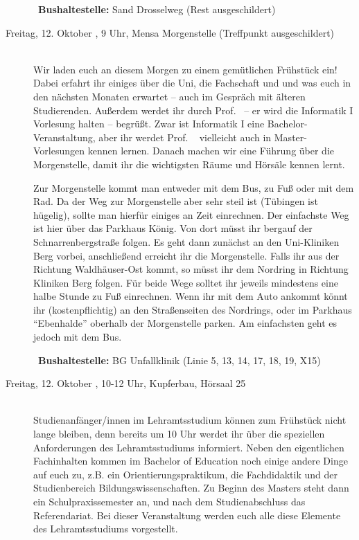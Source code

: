 \begin{description}
~\textbf{Bushaltestelle:} Sand Drosselweg (Rest ausgeschildert)


\item[Freitag, 12. Oktober \Jahr, 9 Uhr, Mensa Morgenstelle (Treffpunkt ausgeschildert)]\ \\
Wir laden euch an diesem Morgen zu einem gemütlichen Frühstück ein! Dabei erfahrt ihr einiges über die Uni, die Fachschaft und und was euch in den nächsten Monaten erwartet -- auch im Gespräch mit älteren
Studierenden. Außerdem werdet ihr durch Prof. \Infoprof~-- er wird die Informatik I Vorlesung halten -- begrüßt.
\ifmaster Zwar ist Informatik I eine Bachelor-Veranstaltung, aber ihr werdet Prof. \Infoprof~ vielleicht auch in Master-Vorlesungen kennen lernen. \fi
Danach machen wir eine Führung über die Morgenstelle, damit ihr die wichtigsten Räume und Hörsäle kennen lernt.

Zur Morgenstelle kommt man entweder mit dem Bus, zu Fuß oder mit dem Rad. Da der Weg zur Morgenstelle aber sehr steil ist (Tübingen ist hügelig), sollte man hierfür einiges an Zeit einrechnen.
Der einfachste Weg ist hier über das Parkhaus König. Von dort müsst ihr bergauf der Schnarrenbergstraße folgen. Es geht dann zunächst an den Uni-Kliniken Berg vorbei, anschließend erreicht ihr die Morgenstelle. Falls ihr aus der Richtung Waldh\"auser-Ost kommt, so m\"usst ihr dem Nordring in Richtung Kliniken Berg folgen. Für beide Wege solltet ihr jeweils mindestens eine halbe Stunde zu Fuß einrechnen.
Wenn ihr mit dem Auto ankommt k\"onnt ihr (kostenpflichtig) an den Straßenseiten des Nordrings, oder im Parkhaus "`Ebenhalde"' oberhalb der Morgenstelle parken. Am einfachsten geht es jedoch mit dem Bus.

~\textbf{Bushaltestelle:} BG Unfallklinik (Linie 5, 13, 14, 17, 18, 19, X15)

\iflehramt
\item[Freitag, 12. Oktober \Jahr, 10-12 Uhr, Kupferbau, Hörsaal 25]\ \\
Studienanfänger/innen im Lehramtsstudium können zum Frühstück nicht lange bleiben, denn bereits um 10 Uhr werdet ihr über die speziellen
Anforderungen des Lehramtsstudiums informiert. Neben den eigentlichen Fachinhalten kommen im
Bachelor of Education noch einige andere Dinge auf euch zu, z.B. ein Orientierungspraktikum, die
Fachdidaktik und der Studienbereich Bildungswissenschaften. Zu Beginn des Masters steht dann
ein Schulpraxissemester an, und nach dem Studienabschluss das Referendariat. Bei dieser Veranstaltung werden euch
alle diese Elemente des Lehramtsstudiums vorgestellt.


\end{description}
